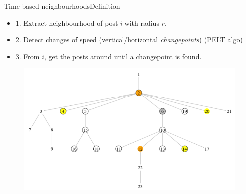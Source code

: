 \documentclass{beamer}
\begin{document}
\begin{frame}{Time-based neighbourhoods}{Definition}
\begin{itemize}
	\item 1. Extract neighbourhood of post $i$ with radius $r$.
	\item 2. Detect changes of speed (vertical/horizontal \textit{changepoints}) (PELT algo)
	\item 3. From $i$, get the posts around until a changepoint is found.
\end{itemize}
	\begin{figure}
		\centering
		\includegraphics[width=1\textwidth]{breakpoints2}
	\end{figure}
\end{frame}
\end{document}
